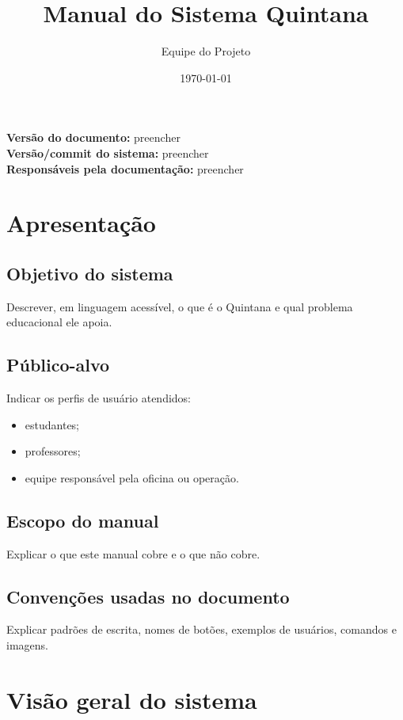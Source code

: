 \documentclass[12pt,a4paper]{article}
\title{Manual do Sistema Quintana}
\author{Equipe do Projeto}
\date{\today}
\begin{document}
\maketitle

\begin{center}
\textbf{Versão do documento:} preencher \\
\textbf{Versão/commit do sistema:} preencher \\
\textbf{Responsáveis pela documentação:} preencher
\end{center}

\newpage
\tableofcontents
\newpage

\section{Apresentação}

\subsection{Objetivo do sistema}
Descrever, em linguagem acessível, o que é o Quintana e qual problema educacional ele apoia.

\subsection{Público-alvo}
Indicar os perfis de usuário atendidos:
\begin{itemize}
    \item estudantes;
    \item professores;
    \item equipe responsável pela oficina ou operação.
\end{itemize}

\subsection{Escopo do manual}
Explicar o que este manual cobre e o que não cobre.

\subsection{Convenções usadas no documento}
Explicar padrões de escrita, nomes de botões, exemplos de usuários, comandos e imagens.

\section{Visão geral do sistema}
\end{document}
